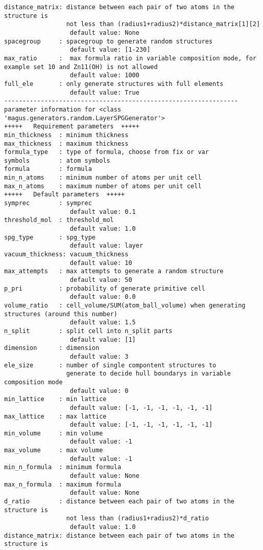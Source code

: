 \documentclass[12pt,oneside]{book}
\begin{document}
\begin{tcolorbox}
\begin{verbatim}
distance_matrix: distance between each pair of two atoms in the structure is
                 not less than (radius1+radius2)*distance_matrix[1][2]
                  default value: None
spacegroup     : spacegroup to generate random structures
                  default value: [1-230]
max_ratio      :  max formula ratio in variable composition mode, for example set 10 and Zn11(OH) is not allowed
                  default value: 1000
full_ele       : only generate structures with full elements
                  default value: True
----------------------------------------------------------------
parameter information for <class 'magus.generators.random.LayerSPGGenerator'>
+++++	Requirement parameters	+++++
min_thickness  : minimum thickness
max_thickness  : maximum thickness
formula_type   : type of formula, choose from fix or var
symbols        : atom symbols
formula        : formula
min_n_atoms    : minimum number of atoms per unit cell
max_n_atoms    : maximum number of atoms per unit cell
+++++	Default parameters	+++++
symprec        : symprec
                  default value: 0.1
threshold_mol  : threshold_mol
                  default value: 1.0
spg_type       : spg_type
                  default value: layer
vacuum_thickness: vacuum_thickness
                  default value: 10
max_attempts   : max attempts to generate a random structure
                  default value: 50
p_pri          : probability of generate primitive cell
                  default value: 0.0
volume_ratio   : cell_volume/SUM(atom_ball_volume) when generating structures (around this number)
                  default value: 1.5
n_split        : split cell into n_split parts
                  default value: [1]
dimension      : dimension
                  default value: 3
ele_size       : number of single compontent structures to
                 generate to decide hull boundarys in variable composition mode
                  default value: 0
min_lattice    : min lattice
                  default value: [-1, -1, -1, -1, -1, -1]
max_lattice    : max lattice
                  default value: [-1, -1, -1, -1, -1, -1]
min_volume     : min volume
                  default value: -1
max_volume     : max volume
                  default value: -1
min_n_formula  : minimum formula
                  default value: None
max_n_formula  : maximum formula
                  default value: None
d_ratio        : distance between each pair of two atoms in the structure is
                 not less than (radius1+radius2)*d_ratio
                  default value: 1.0
distance_matrix: distance between each pair of two atoms in the structure is

\end{verbatim}
\end{tcolorbox}
\end{document}
